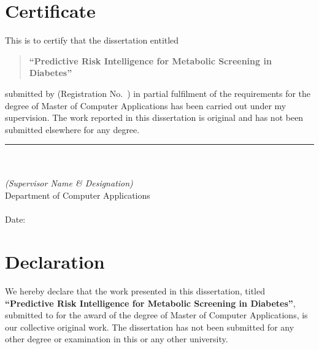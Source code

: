 \documentclass[12pt,a4paper,oneside]{report}
\begin{document}
\clearpage
\chapter*{Certificate}
\thispagestyle{plain}

This is to certify that the dissertation entitled

\begin{quote}
\textbf{``Predictive Risk Intelligence for Metabolic Screening in Diabetes''}
\end{quote}

\noindent submitted by \underline{\hspace{5cm}} (Registration No.\ \underline{\hspace{3cm}}) in partial fulfilment of the requirements for the degree of Master of Computer Applications has been carried out under my supervision. The work reported in this dissertation is original and has not been submitted elsewhere for any degree.

\vspace{2cm}
\begin{flushright}
\rule{7cm}{0.4pt}\\
\underline{\hspace{6cm}}\\
\textit{(Supervisor Name \& Designation)}\\
Department of Computer Applications\\
\underline{\hspace{5cm}}\\
Date: \underline{\hspace{3cm}}
\end{flushright}

\clearpage
\chapter*{Declaration}

We hereby declare that the work presented in this dissertation, titled \textbf{``Predictive Risk Intelligence for Metabolic Screening in Diabetes''}, submitted to \underline{\hspace{5cm}} for the award of the degree of Master of Computer Applications, is our collective original work. The dissertation has not been submitted for any other degree or examination in this or any other university.
\end{document}
